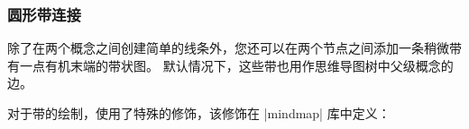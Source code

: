 \subsubsection{圆形带连接}


除了在两个概念之间创建简单的线条外，您还可以在两个节点之间添加一条稍微带有一点有机末端的带状图。 默认情况下，这些带也用作思维导图树中父级概念的边。


对于带的绘制，使用了特殊的修饰，该修饰在 |mindmap| 库中定义：


